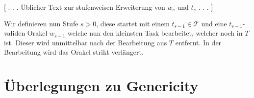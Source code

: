 \documentclass[nofonts]{uebung}
\begin{document}
[ . . . Üblicher Text zur stufenweisen Erweiterung von $w_s$ und $t_s$ . . . ]

Wir definieren nun Stufe $s>0$, diese startet mit einem $t_{s-1}\in\mathcal T$ und eine $t_{s-1}$-validen Orakel $w_{s-1}$ welche nun den kleinsten Task bearbeitet, welcher noch in $T$ ist. Dieser wird unmittelbar nach der Bearbeitung aus $T$ entfernt. In der Bearbeitung wird das Orakel strikt verlängert.


\clearpage
\section*{Überlegungen zu Genericity}
\setcounter{theorem}{0}
\end{document}
